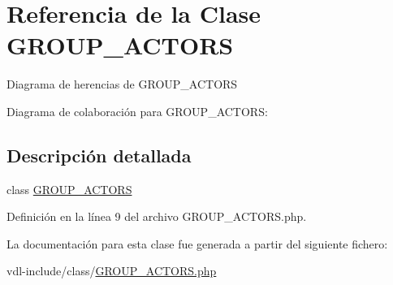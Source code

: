 \hypertarget{classGROUP__ACTORS}{\section{Referencia de la Clase G\-R\-O\-U\-P\-\_\-\-A\-C\-T\-O\-R\-S}
\label{classGROUP__ACTORS}
}


Diagrama de herencias de G\-R\-O\-U\-P\-\_\-\-A\-C\-T\-O\-R\-S


Diagrama de colaboración para G\-R\-O\-U\-P\-\_\-\-A\-C\-T\-O\-R\-S\-:


\subsection{Descripción detallada}
class \hyperlink{classGROUP__ACTORS}{G\-R\-O\-U\-P\-\_\-\-A\-C\-T\-O\-R\-S} 

Definición en la línea 9 del archivo G\-R\-O\-U\-P\-\_\-\-A\-C\-T\-O\-R\-S.\-php.



La documentación para esta clase fue generada a partir del siguiente fichero\-:\begin{DoxyCompactItemize}
\item 
vdl-\/include/class/\hyperlink{GROUP__ACTORS_8php}{G\-R\-O\-U\-P\-\_\-\-A\-C\-T\-O\-R\-S.\-php}\end{DoxyCompactItemize}
